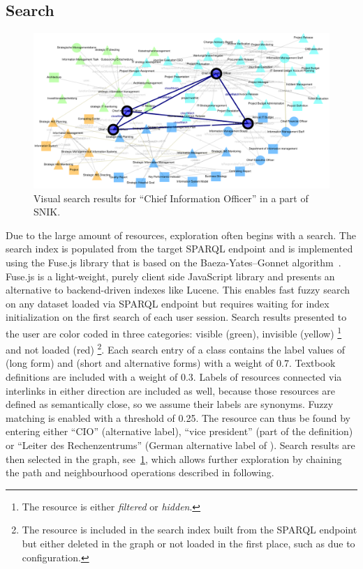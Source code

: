 \documentclass[conference]{IEEEtran}
\begin{document}
\subsection{Search}
\begin{figure}[h!]
    \centering
    \includegraphics[width=\linewidth]{search.pdf}
    \caption{Visual search results for \enquote{Chief Information Officer} in a part of SNIK.}\label{fig:search}
\end{figure}

Due to the large amount of resources, exploration often begins with a search.
The search index is populated from the target SPARQL endpoint and is implemented using the Fuse.js library that is based on the Baeza-Yates--Gonnet algorithm~\cite{textsearching}.
Fuse.js\footnotemark{} is a light-weight, purely client side JavaScript library and presents an alternative to backend-driven indexes like Lucene.%
This enables fast fuzzy search on any dataset loaded via SPARQL endpoint but requires waiting for index initialization on the first search of each user session.
Search results presented to the user are color coded in three categories: visible (green), invisible (yellow)%
\footnote{The resource is either \emph{filtered} or \emph{hidden}.}%
 and not loaded (red)%
\footnote{The resource is included in the search index built from the SPARQL endpoint but either deleted in the graph or not loaded in the first place, such as due to configuration.}.
Each search entry of a class contains the label values of  (long form) and  (short and alternative forms) with a weight of 0.7.
Textbook definitions are included with a weight of 0.3.
Labels of resources connected via  interlinks in either direction are included as well, because those resources are defined as semantically close, so we assume their labels are synonyms.
Fuzzy matching is enabled with a threshold of \num{0.25}.
The resource  can thus be found by entering either \enquote{CIO} (alternative label), \enquote{vice president} (part of the definition) or \enquote{Leiter des Rechenzentrums} (German alternative label of ).
Search results are then selected in the graph, see~\cref{fig:search}, which allows further exploration by chaining the path and neighbourhood operations described in following.
\end{document}
